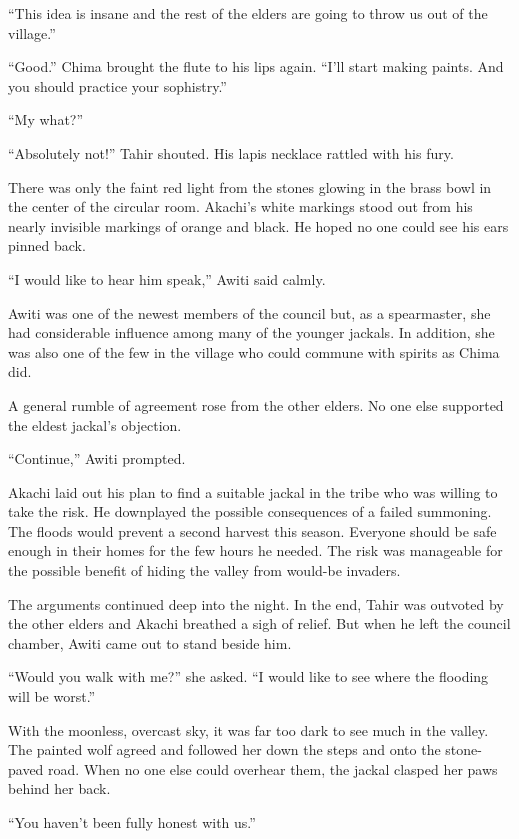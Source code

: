 ``This idea is insane and the rest of the elders are going to throw us out of the village.''

``Good.'' Chima brought the flute to his lips again. ``I'll start making paints. And you should practice your sophistry.''

``My what?''

\secdiv

\noindent ``Absolutely not!'' Tahir shouted. His lapis necklace rattled with his fury.

There was only the faint red light from the stones glowing in the brass bowl in the center of the circular room. Akachi's white markings stood out from his nearly invisible markings of orange and black. He hoped no one could see his ears pinned back.

``I would like to hear him speak,'' Awiti said calmly.

Awiti was one of the newest members of the council but, as a spearmaster, she had considerable influence among many of the younger jackals. In addition, she was also one of the few in the village who could commune with spirits as Chima did.

A general rumble of agreement rose from the other elders. No one else supported the eldest jackal's objection.

``Continue,'' Awiti prompted. 

Akachi laid out his plan to find a suitable jackal in the tribe who was willing to take the risk. He downplayed the possible consequences of a failed summoning. The floods would prevent a second harvest this season. Everyone should be safe enough in their homes for the few hours he needed. The risk was manageable for the possible benefit of hiding the valley from would-be invaders.

The arguments continued deep into the night. In the end, Tahir was outvoted by the other elders and Akachi breathed a sigh of relief. But when he left the council chamber, Awiti came out to stand beside him. 

``Would you walk with me?'' she asked. ``I would like to see where the flooding will be worst.''

With the moonless, overcast sky, it was far too dark to see much in the valley. The painted wolf agreed and followed her down the steps and onto the stone-paved road. When no one else could overhear them, the jackal clasped her paws behind her back.

``You haven't been fully honest with us.''

